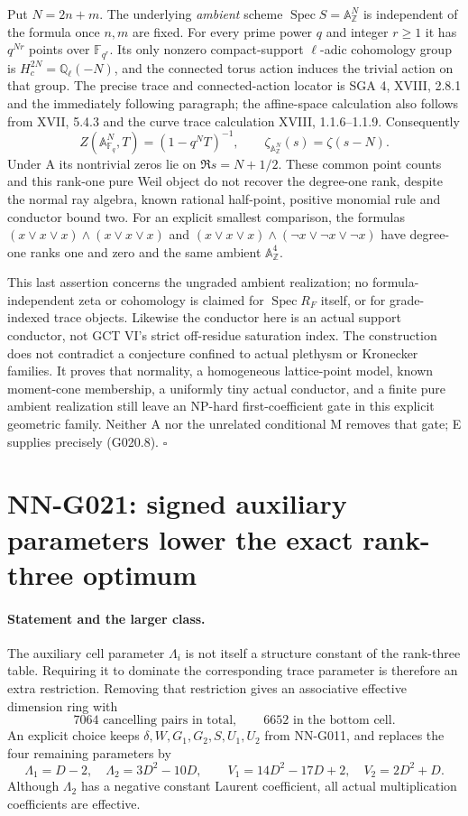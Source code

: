 Put $N=2n+m$. The underlying \emph{ambient} scheme
$\operatorname{Spec}S=\mathbb A^N_{\mathbb Z}$ is independent of
the formula once $n,m$ are fixed. For every prime power $q$ and
integer $r\geq1$ it has $q^{Nr}$ points over $\mathbb F_{q^r}$.
Its only nonzero compact-support $\ell$-adic cohomology group
is $H_c^{2N}=\mathbb Q_\ell(-N)$, and the connected torus action
induces the trivial action on that group. The precise trace and
connected-action locator is SGA 4, XVIII, 2.8.1 and the immediately
following paragraph; the affine-space calculation also follows
from XVII, 5.4.3 and the curve trace calculation XVIII, 1.1.6--1.1.9.
Consequently
\[
 Z(\mathbb A^N_{\mathbb F_q},T)=(1-q^NT)^{-1},\qquad
 \zeta_{\mathbb A^N_{\mathbb Z}}(s)=\zeta(s-N).
 \tag{G020.9}
\]
Under A its nontrivial zeros lie on $\Re s=N+1/2$. These common
point counts and this rank-one pure Weil object do not recover
the degree-one rank, despite the normal ray algebra, known rational
half-point, positive monomial rule and conductor bound two.
For an explicit smallest comparison, the formulas
$(x\vee x\vee x)\wedge(x\vee x\vee x)$ and
$(x\vee x\vee x)\wedge(\neg x\vee\neg x\vee\neg x)$
have degree-one ranks one and zero and the same ambient
$\mathbb A^4_{\mathbb Z}$.

This last assertion concerns the ungraded ambient realization;
no formula-independent zeta or cohomology is claimed for
$\operatorname{Spec}R_F$ itself, or for grade-indexed trace objects.
Likewise the conductor here is an actual support conductor,
not GCT VI's strict off-residue saturation index. The construction
does not contradict a conjecture confined to actual plethysm or
Kronecker families. It proves that normality, a homogeneous
lattice-point model, known moment-cone membership, a uniformly
tiny actual conductor, and a finite pure ambient realization
still leave an NP-hard first-coefficient gate in this explicit
geometric family. Neither A nor the unrelated conditional M
removes that gate; E supplies precisely (G020.8).
\hfill$\square$



\section{NN-G021: signed auxiliary parameters lower the exact rank-three optimum}
\paragraph{Statement and the larger class.}
The auxiliary cell parameter $\Lambda_i$ is not itself a structure
constant of the rank-three table. Requiring it to dominate the
corresponding trace parameter is therefore an extra restriction.
Removing that restriction gives an associative effective dimension
ring with
\[
 7064\text{ cancelling pairs in total},\qquad
 6652\text{ in the bottom cell}.                         \tag{G021.1}
\]
An explicit choice keeps $\delta,W,G_1,G_2,S,U_1,U_2$ from NN-G011,
and replaces the four remaining parameters by
\[
 \Lambda_1=D-2,\quad \Lambda_2=3D^2-10D,\qquad
 V_1=14D^2-17D+2,\quad V_2=2D^2+D.                      \tag{G021.2}
\]
Although $\Lambda_2$ has a negative constant Laurent coefficient,
all actual multiplication coefficients are effective.

